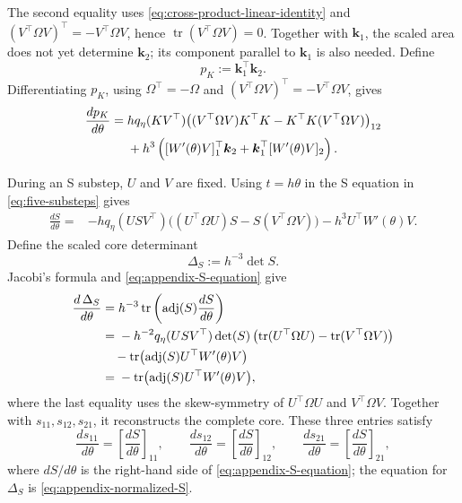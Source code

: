 \documentclass[10pt,a4paper]{amsart}
\numberwithin{equation}{section}
\begin{document}
The second equality uses
\eqref{eq:cross-product-linear-identity} and
$(V^\top\Omega V)^\top=-V^\top\Omega V$, hence
$\operatorname{tr}(V^\top\Omega V)=0$.
Together with \(\boldsymbol k_1\), the scaled area does not yet
determine \(\boldsymbol k_2\); its component parallel to
\(\boldsymbol k_1\) is also needed.  Define
\begin{equation}\label{eq:appendix-K-inner-product}
 p_K:=\boldsymbol k_1^\top\boldsymbol k_2.
\end{equation}
Differentiating \(p_K\), using \(\Omega^\top=-\Omega\) and
\((V^\top\Omega V)^\top=-V^\top\Omega V\), gives
\begin{align}
 \frac{dp_K}{d\theta}
 ={}&hq_\eta(KV^\top)
 \bigl((V^\top\Omega V)K^\top K
       -K^\top K(V^\top\Omega V)\bigr)_{12}\notag\\
 &+h^3\left(
 [W'(\theta)V]_1^\top\boldsymbol k_2
 +\boldsymbol k_1^\top[W'(\theta)V]_2\right).
 \label{eq:appendix-normalized-K-parallel}
\end{align}

During an S substep, $U$ and $V$ are fixed.  Using
\(t=h\theta\) in the S equation in
\eqref{eq:five-substeps} gives
\begin{align}
 \frac{dS}{d\theta}
 ={}&-hq_\eta(USV^\top)
 \bigl((U^\top\Omega U)S-S(V^\top\Omega V)\bigr)
 -h^3U^\top W'(\theta)V.
 \label{eq:appendix-S-equation}
\end{align}
Define the scaled core determinant
\begin{equation}\label{eq:appendix-core-determinant-definition}
 \Delta_S:=h^{-3}\det S.
\end{equation}
Jacobi's formula and \eqref{eq:appendix-S-equation} give
\begin{align}
 \frac{d\,\Delta_S}{d\theta}
 &={}h^{-3}\operatorname{tr}\left(
 \operatorname{adj}(S)\frac{dS}{d\theta}\right)\notag\\
 &={}-h^{-2}q_\eta(USV^\top)\det(S)
 \left(\operatorname{tr}(U^\top\Omega U)
 -\operatorname{tr}(V^\top\Omega V)\right)\notag\\
 &\quad-\operatorname{tr}\bigl(
 \operatorname{adj}(S)U^\top W'(\theta)V\bigr)\notag\\
 &={}-\operatorname{tr}\bigl(
 \operatorname{adj}(S)U^\top W'(\theta)V\bigr),
 \label{eq:appendix-normalized-S}
\end{align}
where the last equality uses the skew-symmetry of
$U^\top\Omega U$ and $V^\top\Omega V$.
Together with \(s_{11},s_{12},s_{21}\), it reconstructs the complete
core.  These three entries satisfy
\begin{equation}\label{eq:appendix-core-coordinate-odes}
 \frac{ds_{11}}{d\theta}=\left[\frac{dS}{d\theta}\right]_{11},
 \qquad
 \frac{ds_{12}}{d\theta}=\left[\frac{dS}{d\theta}\right]_{12},
 \qquad
 \frac{ds_{21}}{d\theta}=\left[\frac{dS}{d\theta}\right]_{21},
\end{equation}
where \(dS/d\theta\) is the right-hand side of
\eqref{eq:appendix-S-equation}; the equation for \(\Delta_S\) is
\eqref{eq:appendix-normalized-S}.
\end{document}
